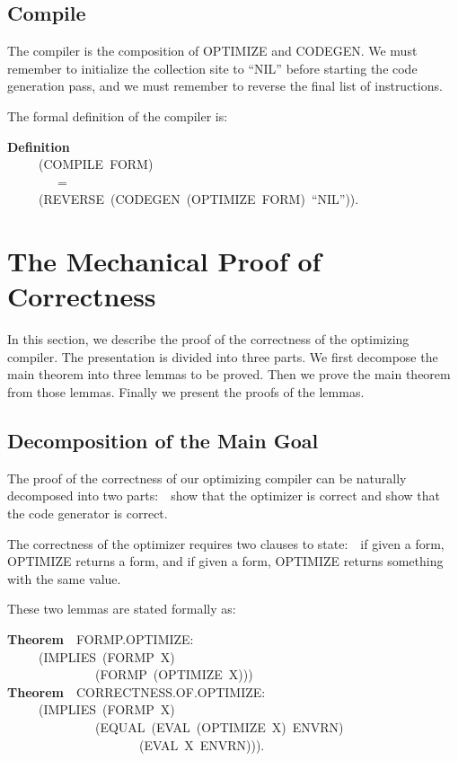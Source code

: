 \documentclass[10pt]{book}
\newenvironment{pubasis}{\begin{flushleft}}{\end{flushleft}}
\newcommand{\axiomordefinition}[1]{\vspace{6pt}\Large\textsf{\textbf{#1}}\normalsize}
\begin{document}
\subsection{Compile}
The compiler is   the composition of OPTIMIZE
and CODEGEN.  We must remember to initialize the collection site to ``NIL''
before starting the code generation pass, and we must remember to reverse
the final list of instructions.

The formal definition of the compiler is:
\begin{pubasis}
\axiomordefinition{Definition}\\
~~~~~(COMPILE~FORM)\\
~~~~~~~~=\\
~~~~~(REVERSE~(CODEGEN~(OPTIMIZE~FORM)~``NIL'')).\\
\end{pubasis}
\section{The Mechanical Proof of Correctness}
In this section, we describe the proof of the correctness of
the optimizing compiler.  The presentation is divided into three parts.
We first decompose the main theorem into three lemmas to be proved.
Then we prove the main theorem from those
lemmas.  Finally we present the proofs of the lemmas.
\subsection{Decomposition of the Main Goal}
The proof of the correctness of our optimizing compiler can be
naturally decomposed into two parts:~~show that the optimizer is correct
and show that the code generator is correct.

The correctness of the optimizer requires two clauses to state:~~if given
a form, OPTIMIZE returns a form, and if given a form, OPTIMIZE returns something
with the same value.

These two lemmas are stated formally as:
\begin{pubasis}
\axiomordefinition{Theorem}~~FORMP.OPTIMIZE:\\
~~~~~(IMPLIES~(FORMP~X)\\
~~~~~~~~~~~~~~(FORMP~(OPTIMIZE~X)))\\

\axiomordefinition{Theorem}~~CORRECTNESS.OF.OPTIMIZE:\\
~~~~~(IMPLIES~(FORMP~X)\\
~~~~~~~~~~~~~~(EQUAL~(EVAL~(OPTIMIZE~X)~ENVRN)\\
~~~~~~~~~~~~~~~~~~~~~(EVAL~X~ENVRN))).\\
~~~~~~~~~~~~~~~~~~~~~~~~~~~~~~~~~~~~~~~~~~~~~~~~~~~~~~~~\\
\end{pubasis}
\end{document}
